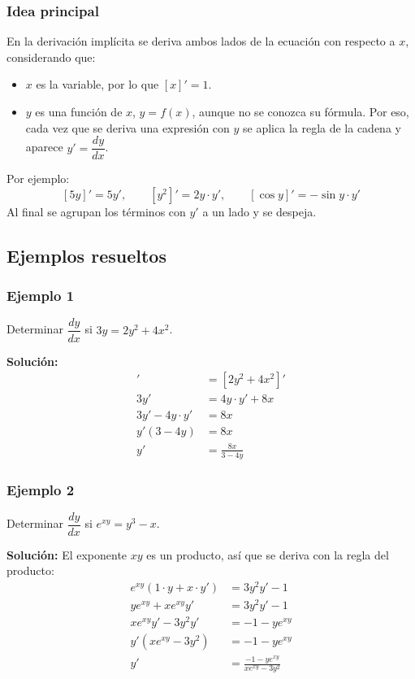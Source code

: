\documentclass[12pt]{article}
\begin{document}
\subsubsection{Idea principal}


En la derivación implícita se deriva ambos lados de la ecuación con respecto a $x$, considerando que:
\begin{itemize}
    \item $x$ es la variable, por lo que $[x]' = 1$.
    \item $y$ es una función de $x$, $y = f(x)$, aunque no se conozca su fórmula. Por eso, cada vez que se deriva una expresión con $y$ se aplica la regla de la cadena y aparece $y' = \dfrac{dy}{dx}$.
\end{itemize}
Por ejemplo:
\[
[5y]' = 5y', \qquad [y^2]' = 2y \cdot y', \qquad [\cos y]' = -\sin y \cdot y'
\]
Al final se agrupan los términos con $y'$ a un lado y se despeja.



\subsection{Ejemplos resueltos}

\subsubsection{Ejemplo 1}


Determinar $\dfrac{dy}{dx}$ si $3y = 2y^2 + 4x^2$.

\textbf{Solución:}
\begin{align*}
[3y]' &= [2y^2 + 4x^2]' \\
3y' &= 4y \cdot y' + 8x \\
3y' - 4y \cdot y' &= 8x \\
y'(3 - 4y) &= 8x \\
y' &= \frac{8x}{3 - 4y}
\end{align*}



\subsubsection{Ejemplo 2}


Determinar $\dfrac{dy}{dx}$ si $e^{xy} = y^3 - x$.

\textbf{Solución:} El exponente $xy$ es un producto, así que se deriva con la regla del producto:
\begin{align*}
e^{xy}(1 \cdot y + x \cdot y') &= 3y^2 y' - 1 \\
y e^{xy} + x e^{xy} y' &= 3y^2 y' - 1 \\
x e^{xy} y' - 3y^2 y' &= -1 - y e^{xy} \\
y'\left(x e^{xy} - 3y^2\right) &= -1 - y e^{xy} \\
y' &= \frac{-1 - y e^{xy}}{x e^{xy} - 3y^2}
\end{align*}
\end{document}
